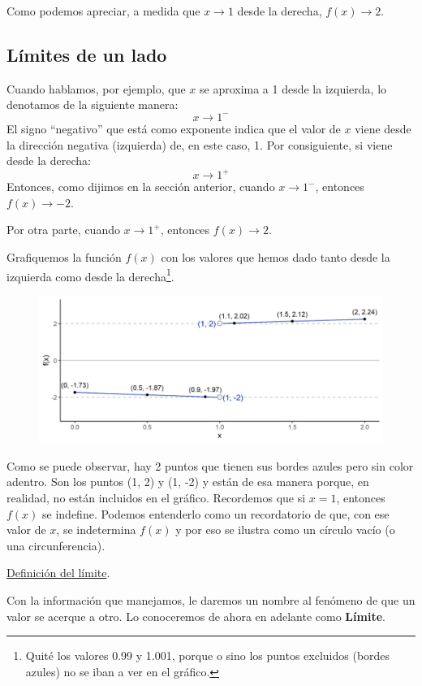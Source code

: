 \documentclass[12pt]{article}
\begin{document}
Como podemos apreciar, a medida que $x \to 1$ desde la derecha, $f(x) \to 2$.


\subsection{Límites de un lado}

Cuando hablamos, por ejemplo, que $x$ se aproxima a 1 desde la izquierda, lo denotamos de la siguiente manera:
\[x \to 1^{-}\]
El signo ``negativo'' que está como exponente indica que el valor de $x$ viene desde la dirección negativa (izquierda) de, en este caso, 1. Por consiguiente, si viene desde la derecha:
\[x \to 1^{+}\]
Entonces, como dijimos en la sección anterior, cuando $x \to 1^{-}$, entonces $f(x) \to -2$.

Por otra parte, cuando $x\to 1^{+}$, entonces $f(x) \to 2$.

Grafiquemos la función $f(x)$ con los valores que hemos dado tanto desde la izquierda como desde la derecha\footnote{Quité los valores 0.99 y 1.001, porque o sino los puntos excluidos (bordes azules) no se iban a ver en el gráfico.}.

\begin{figure}[hbt!]
\includegraphics[scale=0.7]{img/limit_plot.jpg}
\end{figure}

Como se puede observar, hay 2 puntos que tienen sus bordes azules pero sin color adentro. Son los puntos (1, 2) y (1, -2) y están de esa manera porque, en realidad, no están incluidos en el gráfico. Recordemos que si $x = 1$, entonces $f(x)$ se indefine. Podemos entenderlo como un recordatorio de que, con ese valor de $x$, se indetermina $f(x)$ y por eso se ilustra como un círculo vacío (o una circunferencia).

\underline{Definición del límite}.

Con la información que manejamos, le daremos un nombre al fenómeno de que un valor se acerque a otro. Lo conoceremos de ahora en adelante como \textbf{Límite}.
\end{document}

